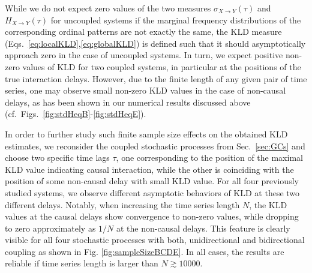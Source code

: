 \documentclass[12pt,aip,cha,reprint,nofootinbib]{revtex4-1}
\begin{document}
While we do not expect zero values of the two measures $\sigma_{X\to Y}(\tau)$ and $H_{X\to Y}(\tau)$ for uncoupled systems if the marginal frequency distributions of the corresponding ordinal patterns are not exactly the same, the KLD measure (Eqs.~\ref{eq:localKLD},\ref{eq:globalKLD}) is defined such that it should asymptotically approach zero in the case of uncoupled systems. In turn, we expect positive non-zero values of KLD for two coupled systems, in particular at the positions of the true interaction delays. However, due to the finite length of any given pair of time series, one may observe small non-zero KLD values in the case of non-causal delays, as has been shown in our numerical results discussed above (cf.\ Figs.~\ref{fig:stdHeqB}-\ref{fig:stdHeqE}). 

In order to further study such finite sample size effects on the obtained KLD estimates, we reconsider the coupled stochastic processes from Sec.~\ref{sec:GCs} and choose two specific time lags $\tau$, one corresponding to the position of the maximal KLD value indicating causal interaction, while the other is coinciding with the position of some non-causal delay with small KLD value. For all four previously studied systems, we observe different asymptotic behaviors of KLD at these two different delays. Notably, when increasing the time series length $N$, the KLD values at the causal delays show convergence to non-zero values, while dropping to zero approximately as $1/N$ at the non-causal delays. This feature is clearly visible for all four stochastic processes with both, unidirectional and bidirectional coupling as shown in Fig. \ref{fig:sampleSizeBCDE}. {\color{red}In all cases, the results are reliable if time series length is larger than $N \gtrsim 10000$.} 
\end{document}
